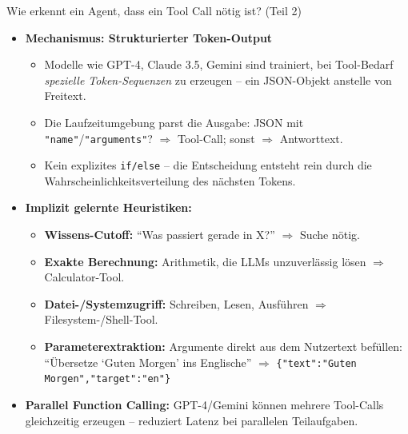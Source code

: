 \documentclass[aspectratio=1610, xcolor=dvipsnames, 9pt]{beamer}
\begin{document}
\begin{frame}{Wie erkennt ein Agent, dass ein Tool Call nötig ist? (Teil 2)}
  \begin{itemize}
    \item \textbf{Mechanismus: Strukturierter Token-Output}
      \begin{itemize}
        \item Modelle wie GPT-4, Claude 3.5, Gemini sind trainiert, bei Tool-Bedarf \emph{spezielle Token-Sequenzen} zu erzeugen -- ein JSON-Objekt anstelle von Freitext.
        \item Die Laufzeitumgebung parst die Ausgabe: JSON mit \texttt{"name"}/\texttt{"arguments"}? $\Rightarrow$ Tool-Call; sonst $\Rightarrow$ Antworttext.
        \item Kein explizites \texttt{if/else} -- die Entscheidung entsteht rein durch die Wahrscheinlichkeitsverteilung des nächsten Tokens.
      \end{itemize}
    \vspace{0.2cm}
    \item \textbf{Implizit gelernte Heuristiken:}
      \begin{itemize}
        \item \textbf{Wissens-Cutoff:} ``Was passiert gerade in X?'' $\Rightarrow$ Suche nötig.
        \item \textbf{Exakte Berechnung:} Arithmetik, die LLMs unzuverlässig lösen $\Rightarrow$ Calculator-Tool.
        \item \textbf{Datei-/Systemzugriff:} Schreiben, Lesen, Ausführen $\Rightarrow$ Filesystem-/Shell-Tool.
        \item \textbf{Parameterextraktion:} Argumente direkt aus dem Nutzertext befüllen:\\
          ``Übersetze `Guten Morgen' ins Englische'' $\Rightarrow$ \texttt{\{"text":"Guten Morgen","target":"en"\}}
      \end{itemize}
    \item \textbf{Parallel Function Calling:} GPT-4/Gemini können mehrere Tool-Calls gleichzeitig erzeugen -- reduziert Latenz bei parallelen Teilaufgaben.
  \end{itemize}
\end{frame}
\end{document}
